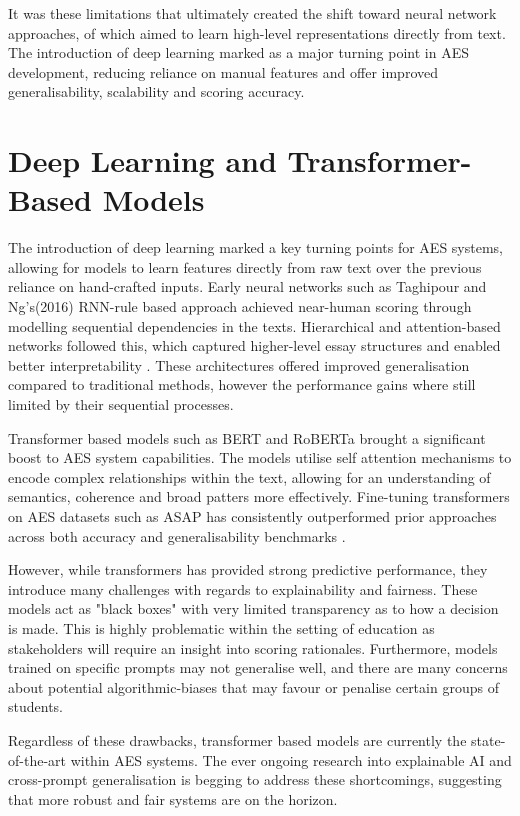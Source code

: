 \documentclass[10pt]{report}
\begin{document}
It was these limitations that ultimately created the shift toward neural network approaches, of which aimed to learn high-level representations directly from text. The introduction of deep learning marked as a major turning point in AES development, reducing reliance on manual features and offer improved generalisability, scalability and scoring accuracy. 

\section{Deep Learning and Transformer-Based Models}
The introduction of deep learning marked a key turning points for AES systems, allowing for models to learn features directly from raw text over the previous reliance on hand-crafted inputs. Early neural networks such as Taghipour and Ng's(2016) RNN-rule based approach achieved near-human scoring through modelling sequential dependencies in the texts. Hierarchical and attention-based networks followed this, which captured higher-level essay structures and enabled better interpretability \parencite{yang2016han}. These architectures offered improved generalisation compared to traditional methods, however the performance gains where still limited by their sequential processes.

Transformer based models such as BERT and RoBERTa brought a significant boost to AES system capabilities. The models utilise self attention mechanisms to encode complex relationships within the text, allowing for an understanding of semantics, coherence and broad patters more effectively. Fine-tuning transformers on AES datasets such as ASAP has consistently outperformed prior approaches across both accuracy and generalisability benchmarks \parencite{taghipour2016neural}.

However, while transformers has provided strong predictive performance, they introduce many challenges with regards to explainability and fairness. These models act as "black boxes" with very limited transparency as to how a decision is made\parencite{lundberg2017unified}. This is highly problematic within the setting of education as stakeholders will require an insight into scoring rationales. Furthermore, models trained on specific prompts may not generalise well, and there are many concerns about potential algorithmic-biases that may favour or penalise certain groups of students.

Regardless of these drawbacks, transformer based models are currently the state-of-the-art within AES systems. The ever ongoing research into explainable AI and cross-prompt generalisation is begging to address these shortcomings, suggesting that more robust and fair systems are on the horizon.
\end{document}
